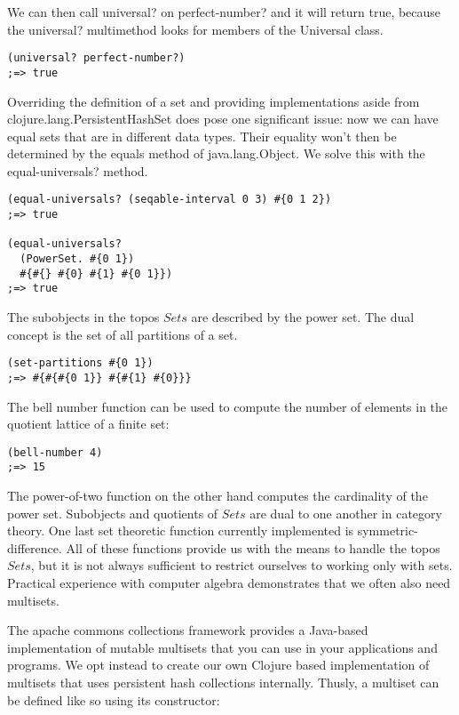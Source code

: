\documentclass[a4paper,11pt]{report}
\begin{document}
We can then call universal? on perfect-number? and it will return true, because the universal? multimethod looks for members of the Universal class.

\lstset {language=Lisp}
\begin{lstlisting}
(universal? perfect-number?) 
;=> true
\end{lstlisting}

Overriding the definition of a set and providing implementations aside from clojure.lang.PersistentHashSet does pose one significant issue: now we can have equal sets that are in different data types. Their equality won't then be determined by the equals method of java.lang.Object. We solve this with the equal-universals? method.

\lstset {language=Lisp}
\begin{lstlisting}
(equal-universals? (seqable-interval 0 3) #{0 1 2})
;=> true

(equal-universals? 
  (PowerSet. #{0 1}) 
  #{#{} #{0} #{1} #{0 1}})
;=> true
\end{lstlisting}

The subobjects in the topos $Sets$ are described by the power set. The dual concept is the set of all partitions of a set. 

\lstset {language=Lisp}
\begin{lstlisting}
(set-partitions #{0 1})
;=> #{#{#{0 1}} #{#{1} #{0}}}
\end{lstlisting}

The bell number function can be used to compute the number of elements in the quotient lattice of a finite set:

\lstset {language=Lisp}
\begin{lstlisting}
(bell-number 4)
;=> 15
\end{lstlisting}

The power-of-two function on the other hand computes the cardinality of the power set. Subobjects and quotients of $Sets$ are dual to one another in category theory. One last set theoretic function currently implemented is symmetric-difference. All of these functions provide us with the means to handle the topos $Sets$, but it is not always sufficient to restrict ourselves to working only with sets. Practical experience with computer algebra demonstrates that we often also need multisets.

\newpage 

The apache commons collections framework provides a Java-based implementation of mutable multisets that you can use in your applications and programs. We opt instead to create our own Clojure based implementation of multisets that uses persistent hash collections internally. Thusly, a multiset can be defined like so using its constructor:
\end{document}
